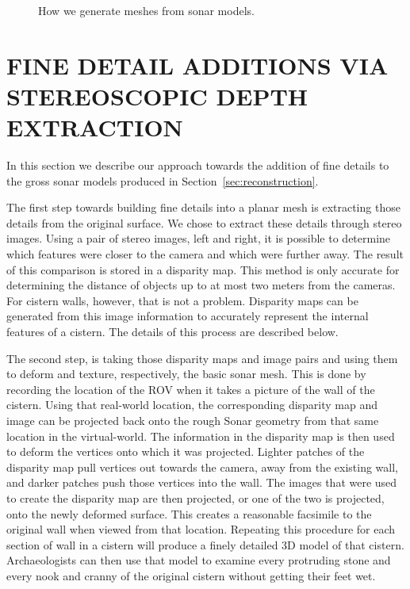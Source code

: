 \documentclass[a4paper,twoside]{article}
\begin{document}
\begin{figure*}[!ht]
   \vspace{-0.2cm}
   \caption{How we generate meshes from sonar models.}
  \label{fig:meshgen}
 \end{figure*}

\section{\uppercase{Fine Detail Additions Via Stereoscopic Depth Extraction}}
\label{sec:detail}

\noindent In this section we describe our approach towards the addition of fine details to the gross sonar models produced in Section~\ref{sec:reconstruction}. 

The first step towards building fine details into a planar mesh is extracting those details from the original surface. 
We chose to extract these details through stereo images.  
Using a pair of stereo images, left and right, it is possible to determine which features were closer to the camera and which were further away.  
The result of this comparison is stored in a disparity map.  
This method is only accurate for determining the distance of objects up to at most two meters from the cameras.  
For cistern walls, however, that is not a problem.  
Disparity maps can be generated from this image information to accurately represent the internal features of a cistern. 
The details of this process are described below.

The second step, is taking those disparity maps and image pairs and using them to deform and texture, respectively, the basic sonar mesh. 
This is done by recording the location of the ROV when it takes a picture of the wall of the cistern.  
Using that real-world location, the corresponding disparity map and image can be projected back onto the rough Sonar geometry from that same location in the virtual-world.
The information in the disparity map is then used to deform the vertices onto which it was projected.
Lighter patches of the disparity map pull vertices out towards the camera, away from the existing wall, and darker patches push those vertices into the wall.
The images that were used to create the disparity map are then projected, or one of the two is projected, onto the newly deformed surface.  
This creates a reasonable facsimile to the original wall when viewed from that location.  
Repeating this procedure for each section of wall in a cistern will produce a finely detailed 3D model of that cistern.  
Archaeologists can then use that model to examine every protruding stone and every nook and cranny of the original cistern without getting their feet wet.
\end{document}
